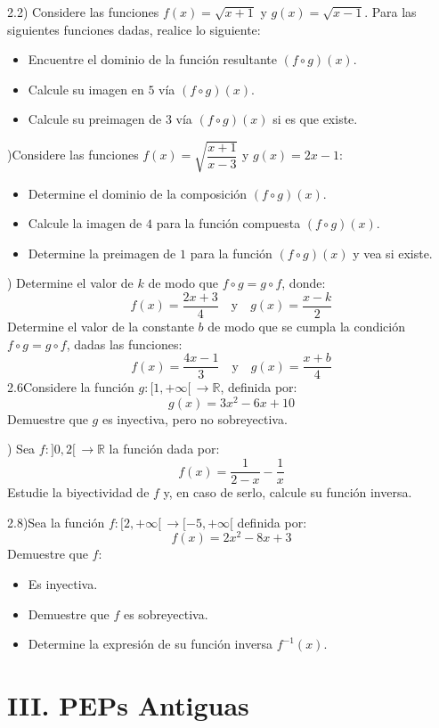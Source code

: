 \documentclass[letterpaper, 12pt]{article}
\begin{document}
2.2)
Considere las funciones $f(x)=\sqrt{x+1}$ y $g(x)=\sqrt{x-1}$. Para las siguientes funciones dadas, realice lo siguiente:
    \begin{itemize}
        \item Encuentre el dominio de la función resultante $(f\circ g)(x)$.
        \item Calcule su imagen en $5$ vía $(f\circ g)(x)$.
        \item Calcule su preimagen de $3$ vía $(f\circ g)(x)$ si es que existe.
    \end{itemize}
    )Considere las funciones $f(x)=\sqrt{\dfrac{x+1}{x-3}}$ y $g(x)=2x-1$:
    \begin{itemize}
        \item Determine el dominio de la composición $(f\circ g)(x)$.
        \item Calcule la imagen de $4$ para la función compuesta $(f\circ g)(x)$.
        \item Determine la preimagen de $1$ para la función $(f\circ g)(x)$ y vea si existe.
    \end{itemize} 
) Determine el valor de $k$ de modo que $f\circ g = g\circ f$, donde:
    \[
    f(x) = \frac{2x+3}{4} \quad \text{y} \quad g(x) = \frac{x-k}{2}
    \]
 Determine el valor de la constante $b$ de modo que se cumpla la condición $f\circ g = g\circ f$, dadas las funciones:
    \[
    f(x) = \frac{4x-1}{3} \quad \text{y} \quad g(x) = \frac{x+b}{4}
    \]
\medskip
2.6Considere la función $g:[1,+\infty[\,\rightarrow\mathbb{R}$, definida por:
    \[
    g(x) = 3x^{2}-6x+10
    \]
    Demuestre que $g$ es inyectiva, pero no sobreyectiva.
\vspace{4 cm}

) Sea $f:]0,2[\,\rightarrow\mathbb{R}$ la función dada por:
    \[
    f(x) = \frac{1}{2-x}-\frac{1}{x}
    \]
    Estudie la biyectividad de $f$ y, en caso de serlo, calcule su función inversa.
\medskip

2.8)Sea la función $f:[2,+\infty[\,\rightarrow[-5,+\infty[$ definida por:
    \[
    f(x) = 2x^{2}-8x+3
    \]
    Demuestre que $f$:
    \begin{itemize}
        \item Es inyectiva.
        \item Demuestre que $f$ es sobreyectiva.
        \item Determine la expresión de su función inversa $f^{-1}(x)$.
    \end{itemize}
\newpage
\section*{III. PEPs Antiguas}
\end{document}
